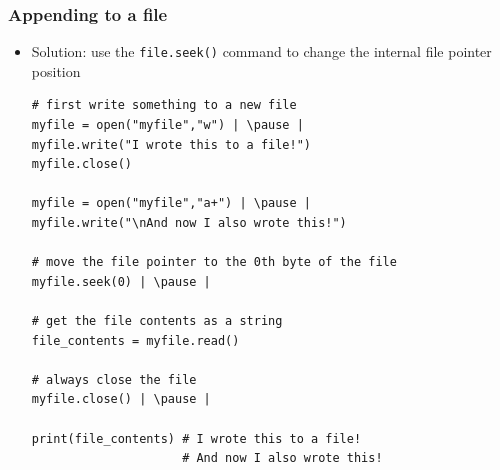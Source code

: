 \documentclass[xcolor=table]{beamer}
\begin{document}
\begin{frame}[fragile]
    \frametitle{Appending to a file}
\begin{itemize}
    \item Solution: use the \texttt{file.seek()} command to change the internal file pointer position \pause 
\begin{lstlisting}[style=python]
# first write something to a new file
myfile = open("myfile","w") | \pause |
myfile.write("I wrote this to a file!")
myfile.close()

myfile = open("myfile","a+") | \pause |
myfile.write("\nAnd now I also wrote this!")

# move the file pointer to the 0th byte of the file
myfile.seek(0) | \pause |

# get the file contents as a string
file_contents = myfile.read() 

# always close the file
myfile.close() | \pause |

print(file_contents) # I wrote this to a file!
                     # And now I also wrote this!
\end{lstlisting} \pause 
\end{itemize}
\end{frame}

\end{document}
